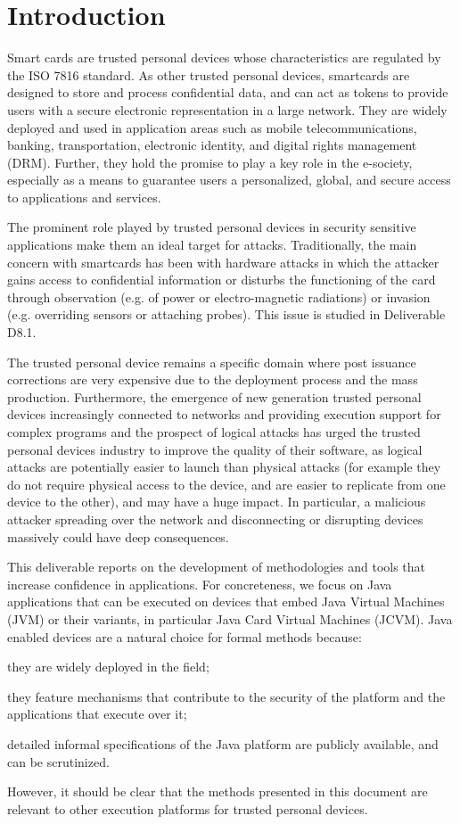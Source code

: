 \section{Introduction}


Smart cards are trusted personal devices whose characteristics are
regulated by the ISO 7816 standard. As other trusted personal devices,
smartcards are designed to store and process confidential data, and
can act as tokens to provide users with a secure electronic
representation in a large network. They are widely deployed and used
in application areas such as mobile telecommunications, banking,
transportation, electronic identity, and digital rights management
(DRM). Further, they hold the promise to play a key role in the
e-society, especially as a means to guarantee users a personalized,
global, and secure access to applications and services.


The prominent role played by trusted personal devices in security
sensitive applications make them an ideal target for
attacks. Traditionally, the main concern with smartcards has been with
hardware attacks in which the attacker gains access to confidential
information or disturbs the functioning of the card through
observation (e.g. of power or electro-magnetic radiations) or invasion
(e.g. overriding sensors or attaching probes). This issue is studied in
Deliverable D8.1.

The trusted personal device remains a specific domain where post
issuance corrections are very expensive due to the deployment process
and the mass production. Furthermore, the emergence of new generation
trusted personal devices increasingly connected to networks and
providing execution support for complex programs and the prospect of
logical attacks has urged the trusted personal devices industry to
improve the quality of their software, as logical attacks are
potentially easier to launch than physical attacks (for example they
do not require physical access to the device, and are easier to
replicate from one device to the other), and may have a huge impact.
In particular, a malicious attacker spreading over the network and
disconnecting or disrupting devices massively could have deep consequences.

This deliverable reports on the development of methodologies and tools
that increase confidence in applications.  For concreteness, we focus 
on Java applications that can be executed on devices that embed Java
Virtual Machines (JVM) or their variants, in particular Java Card
Virtual Machines (JCVM). Java enabled devices are a natural choice for
formal methods because:
\begin{inparaenum}[i)]
\item they are widely deployed in the field;
\item they feature mechanisms that contribute to the security of the
platform and the applications that execute over it;
\item detailed informal specifications of the Java platform are publicly
available, and can be scrutinized.
\end{inparaenum}
However, it should be clear that the methods presented in this document
are relevant to other execution platforms for trusted personal devices.


